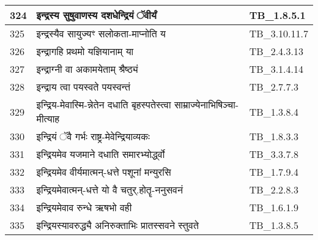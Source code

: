 \documentclass[17pt]{extarticle}
\begin{document}
\begin{longtable}{||p{0.4in}||p{4.9in}||p{0.9in}||}
    324 & इन्द्रस्य सुषुवाणस्य दशधेन्द्रियं ॅवीर्यं & TB\_1.8.5.1       \\
    
    \hline
        
    325 & इन्द्रस्यैव सायुज्यꣳ सलोकता{-}माप्नोति य & TB\_3.10.11.7       \\
    
    \hline
        
    326 & इन्द्रागहि प्रथमो यज्ञियानाम् या & TB\_2.4.3.13       \\
    
    \hline
        
    327 & इन्द्राग्नी वा अकामयेताम् श्रैष्ठ्यं & TB\_3.1.4.14       \\
    
    \hline
        
    328 & इन्द्राय त्वा पयस्वते पयस्वन्तं & TB\_2.7.7.3       \\
    
    \hline
        
    329 & इन्द्रिय{-}मेवास्मि{-}न्नेतेन दधाति बृहस्पतेस्त्वा साम्राज्येनाभिषिञ्चा{-}मीत्याह & TB\_1.3.8.4       \\
    
    \hline
        
    330 & इन्द्रियं ॅवै गर्भः राष्ट्र{-}मेवेन्द्रियाव्यकः & TB\_1.8.3.3       \\
    
    \hline
        
    331 & इन्द्रियमेव यजमाने दधाति समारभ्योर्द्ध्वो & TB\_3.3.7.8       \\
    
    \hline
        
    332 & इन्द्रियमेव वीर्यमात्मन्{-}धत्ते पशूनां मन्युरसि & TB\_1.7.9.4       \\
    
    \hline
        
    333 & इन्द्रियमेवात्मन्{-}धत्ते यो वै चतुर्.होतॄ{-}ननुसवनं & TB\_2.2.8.3       \\
    
    \hline
        
    334 & इन्द्रियमेवाव रुन्धे ऋषभो वही & TB\_1.6.1.9       \\
    
    \hline
        
    335 & इन्द्रियस्यावरुद्ध्यै अनिरुक्ताभिः प्रातस्सवने स्तुवते & TB\_1.3.8.5       \\
    

\end{longtable}
\end{document}
